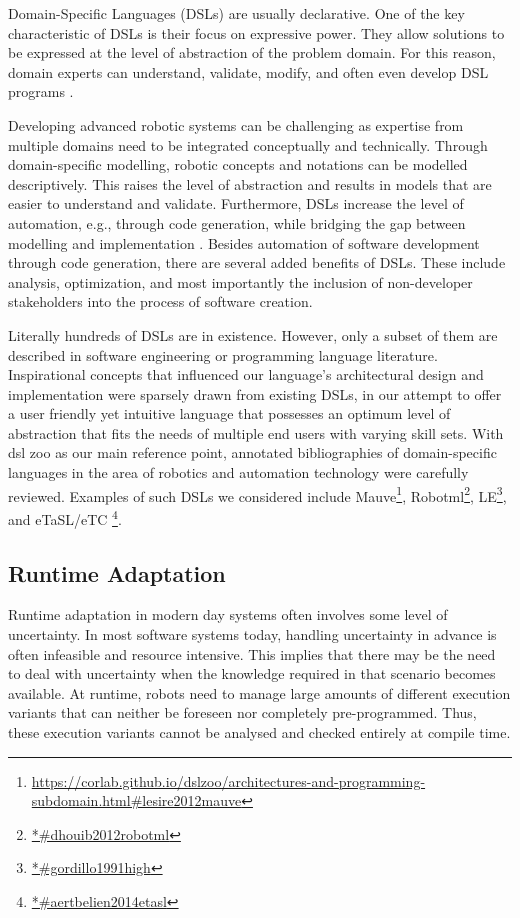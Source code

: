 \documentclass[conference]{IEEEtran}
\newcommand{\foot}[1]{\footnote{\url{#1}}}
\begin{document}
Domain-Specific Languages (DSLs) are usually declarative. One of the key characteristic of DSLs is their focus on expressive power. They allow solutions to be expressed at the level of abstraction of the problem domain. For this reason, domain experts can understand, validate, modify, and often even develop DSL programs \cite{dsl}.

Developing advanced robotic systems can be challenging as expertise from multiple domains need to be integrated conceptually and technically. Through domain-speciﬁc modelling, robotic concepts and notations can be modelled descriptively. This raises the level of abstraction and results in models that are easier to understand and validate. Furthermore, DSLs increase the level of automation, e.g., through code generation, while bridging the gap between modelling and implementation \cite{dsl-robo}. Besides automation of software development through code generation, there are several added benefits of DSLs. These include analysis, optimization, and most importantly the inclusion of non-developer stakeholders into the process of software creation.

Literally hundreds of DSLs are in existence. However, only a subset of them are described in software engineering or programming language literature. Inspirational concepts that influenced our language's architectural design and implementation were sparsely drawn from existing DSLs, in our attempt to offer a user friendly yet intuitive language that possesses an optimum level of abstraction that fits the needs of multiple end users with varying skill sets. With dsl zoo \cite{dsl-robo} as our main reference point, annotated bibliographies of domain-specific languages in the area of robotics and automation technology were carefully reviewed. Examples of such DSLs we considered include Mauve\foot{https://corlab.github.io/dslzoo/architectures-and-programming-subdomain.html#lesire2012mauve}, Robotml\foot{*#dhouib2012robotml}, LE\foot{*#gordillo1991high}, and eTaSL/eTC \foot{*#aertbelien2014etasl}.

\subsection{Runtime Adaptation}
Runtime adaptation in modern day systems often involves some level of uncertainty. In most software systems today, handling uncertainty in advance is often infeasible and resource intensive. This implies that there may be the need to deal with uncertainty when the knowledge required in that scenario becomes available. At runtime, robots need to manage large amounts of different execution variants that can neither be foreseen nor completely pre-programmed. Thus, these execution variants cannot be analysed and checked entirely at compile time.
\end{document}
